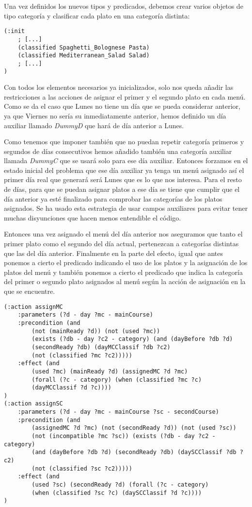 \documentclass{article}
\begin{document}
Una vez definidos los nuevos tipos y predicados, debemos crear varios objetos de tipo categoría y clasificar cada plato en una categoría distinta:
\begin{lstlisting}[language=pddl]
(:init
    ; [...]
    (classified Spaghetti_Bolognese Pasta)
    (classified Mediterranean_Salad Salad)
    ; [...]
)
\end{lstlisting}
Con todos los elementos necesarios ya inicializados, solo nos queda añadir las restricciones a las acciones de asignar el primer y el segundo plato en cada menú.
Como se da el caso que Lunes no tiene un día que se pueda considerar anterior, ya que Viernes no sería su inmediatamente anterior, hemos definido un día auxiliar llamado \textit{DummyD} que hará de día anterior a Lunes.
\par
Como tenemos que imponer también que no puedan repetir categoría primeros y segundos de días consecutivos hemos añadido también una categoría auxiliar llamada \textit{DummyC} que se usará solo para ese día auxiliar. Entonces forzamos en el estado inicial del problema que ese día auxiliar ya tenga un menú asignado así el primer día real que generará será Lunes que es lo que nos interesa. Para el resto de días, para que se puedan asignar platos a ese día se tiene que cumplir que el día anterior ya esté finalizado para comprobar las categorías de los platos asignados. Se ha usado esta estrategia de usar campos auxiliares para evitar tener muchas disyunciones que hacen menos entendible el código.
\par
Entonces una vez asignado el menú del día anterior nos aseguramos que tanto el primer plato como el segundo del día actual, pertenezcan a categorías distintas que las del día anterior. Finalmente en la parte del efecto, igual que antes ponemos a cierto el predicado indicando el uso de los platos y la asignación de los platos del menú y también ponemos a cierto el predicado que indica la categoría del primer o segundo plato asignados al menú según la acción de asignación en la que se encuentre.


\begin{lstlisting}[language=pddl]
(:action assignMC
    :parameters (?d - day ?mc - mainCourse)
    :precondition (and
        (not (mainReady ?d)) (not (used ?mc))
        (exists (?db - day ?c2 - category) (and (dayBefore ?db ?d)
        (secondReady ?db) (dayMCClassif ?db ?c2)
        (not (classified ?mc ?c2)))))
    :effect (and
        (used ?mc) (mainReady ?d) (assignedMC ?d ?mc)
        (forall (?c - category) (when (classified ?mc ?c)
        (dayMCClassif ?d ?c))))
)
(:action assignSC
    :parameters (?d - day ?mc - mainCourse ?sc - secondCourse)
    :precondition (and
        (assignedMC ?d ?mc) (not (secondReady ?d)) (not (used ?sc))
        (not (incompatible ?mc ?sc)) (exists (?db - day ?c2 - category)
        (and (dayBefore ?db ?d) (secondReady ?db) (daySCClassif ?db ?c2)
        (not (classified ?sc ?c2)))))
    :effect (and
        (used ?sc) (secondReady ?d) (forall (?c - category)
        (when (classified ?sc ?c) (daySCClassif ?d ?c))))
)
\end{lstlisting}
\end{document}
